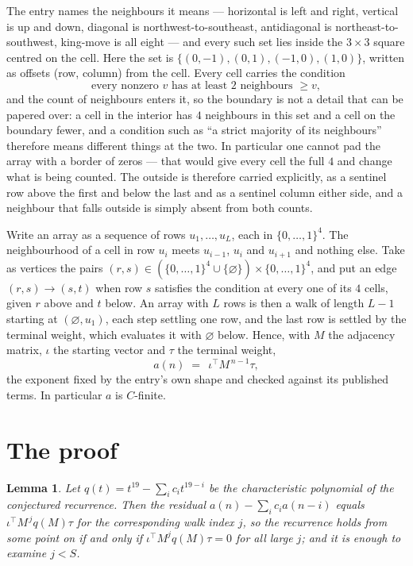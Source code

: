 \documentclass[11pt,a4paper]{article}
\theoremstyle{plain}
\newtheorem{lemma}[theorem]{Lemma}
\theoremstyle{definition}
\begin{document}
The entry names the neighbours it means --- horizontal is left and right, vertical is up and
down, diagonal is northwest-to-southeast, antidiagonal is northeast-to-southwest, king-move is
all eight --- and every such set lies inside the $3\times3$ square centred on the cell. Here
the set is $\{(0,-1), (0,1), (-1,0), (1,0)\}$, written as offsets (row, column) from the cell. Every cell carries
the condition
\[
\text{every nonzero }v\text{ has at least 2 neighbours }\ge v,
\]
and the count of neighbours enters it, so the boundary is not a detail that can be papered
over: a cell in the interior has $4$ neighbours in this set and a cell on the boundary
fewer, and a condition such as ``a strict majority of its neighbours'' therefore means
different things at the two. In particular one cannot pad the array with a border of zeros ---
that would give every cell the full $4$ and change what is being counted. The outside is
therefore carried
explicitly, as a sentinel row above the first and below the last and as a sentinel column
either side, and a neighbour that falls outside is simply absent from both counts.

Write an array as a sequence of rows $u_1,\dots,u_L$, each in
$\{0,\dots,1\}^{4}$. The neighbourhood of a cell in row $u_i$ meets $u_{i-1}$,
$u_i$ and $u_{i+1}$ and nothing else. Take as vertices the pairs
$(r,s)\in(\{0,\dots,1\}^{4}\cup\{\varnothing\})\times\{0,\dots,1\}^{4}$,
and put an edge $(r,s)\to(s,t)$ when row $s$ satisfies the condition at every one of its
$4$ cells, given $r$ above and $t$ below. An array with $L$ rows is then a walk of length
$L-1$ starting at $(\varnothing,u_1)$, each step settling one row, and the last row is
settled by the terminal weight, which evaluates it with $\varnothing$ below. Hence,
with $M$ the adjacency matrix, $\iota$ the starting vector and $\tau$ the terminal weight,
\[
a(n)\;=\;\,\iota^{\!\top}M^{\,n-1}\tau ,
\]
the exponent fixed by the entry's own shape and checked against its published terms. In
particular $a$ is $C$-finite.

\section{The proof}

\begin{lemma}\label{lem:crit}
Let $q(t)=t^{19}-\sum_i c_it^{19-i}$ be the characteristic polynomial of the
conjectured recurrence. Then the residual $a(n)-\sum_ic_ia(n-i)$ equals
$\iota^{\!\top}M^{\,j}q(M)\tau$ for the corresponding walk index $j$, so the
recurrence holds from some point on if and only if $\iota^{\!\top}M^{j}q(M)\tau=0$ for all
large $j$; and it is enough to examine $j<S$.
\end{lemma}
\end{document}
